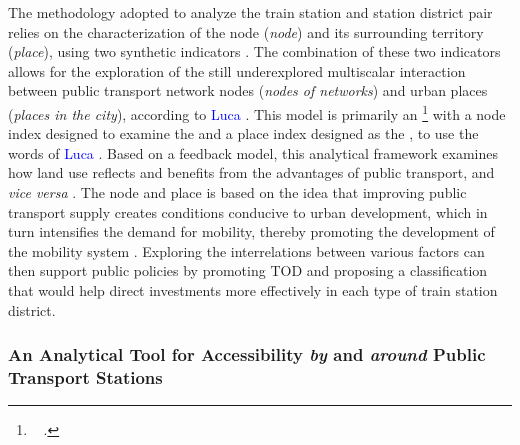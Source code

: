 \begin{refsegment}
The methodology adopted to analyze the train station and station district pair relies on the characterization of the node (\textsl{node}) and its surrounding territory (\textsl{place}), using two synthetic indicators \textcolor{blue}{\autocites[343]{bertolini_nodes_1996}[199]{bertolini_spatial_1999}}. The combination of these two indicators allows for the exploration of the still underexplored multiscalar interaction between public transport network nodes (\textsl{nodes of networks}) and urban places (\textsl{places in the city}), according to \textcolor{blue}{Luca} \textcolor{blue}{\textcite[344]{bertolini_nodes_1996}}. This model is primarily an \footnote{~
     \textcolor{blue}{\autocite[199-201]{bertolini_spatial_1999}}.
} with a node index designed to examine the  and a place index designed as the , to use the words of \textcolor{blue}{Luca} \textcolor{blue}{\textcite[199-201]{bertolini_spatial_1999}}. Based on a feedback model, this analytical framework examines how land use reflects and benefits from the advantages of public transport, and \textsl{vice versa} \textcolor{blue}{\autocite[47]{chorus_application_2011}}. The  node and place is based on the idea that improving public transport supply creates conditions conducive to urban development, which in turn intensifies the demand for mobility, thereby promoting the development of the mobility system \textcolor{blue}{\autocite[47]{chorus_application_2011}}. Exploring the interrelations between various factors can then support public policies by promoting \acrshort{TOD} and proposing a classification that would help direct investments more effectively in each type of train station district.%

\subsubsection*{An Analytical Tool for Accessibility \textsl{by} and \textsl{around} Public Transport Stations
    \label{chap6:litterature-concept-accessibilite}
    }


\end{refsegment}

